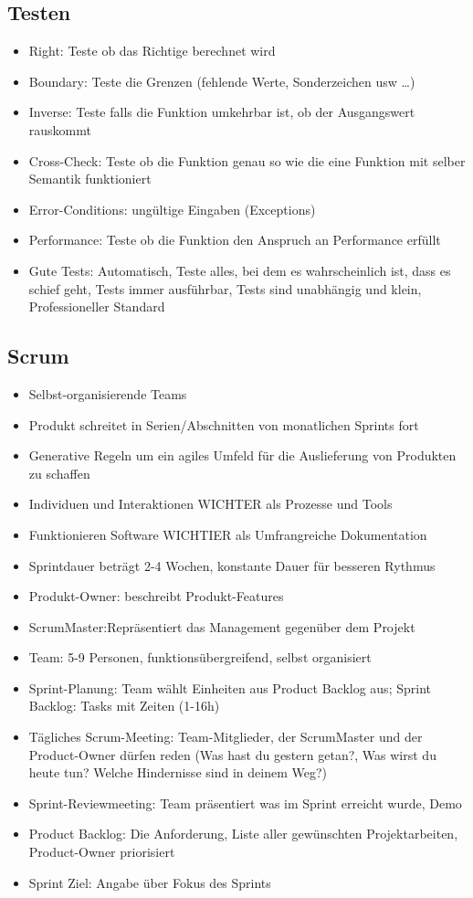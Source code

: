 \documentclass[11pt, fleqn, a4paper, leqno]{scrartcl} %
\begin{document}
		\subsection{Testen}
			\begin{itemize}
				\item Right: Teste ob das Richtige berechnet wird
				\item Boundary: Teste die Grenzen (fehlende Werte, Sonderzeichen usw \dots)
				\item Inverse: Teste falls die Funktion umkehrbar ist, ob der Ausgangswert rauskommt
				\item Cross-Check: Teste ob die Funktion genau so wie die eine Funktion mit selber Semantik funktioniert
				\item Error-Conditions: ungültige Eingaben (Exceptions)
				\item Performance: Teste ob die Funktion den Anspruch an Performance erfüllt
				\item Gute Tests: Automatisch, Teste alles, bei dem es wahrscheinlich ist, dass es schief geht, Tests immer ausführbar, Tests sind unabhängig und klein, Professioneller Standard
			\end{itemize}
		\subsection{Scrum}
			\begin{itemize}
				\item Selbst-organisierende Teams
				\item Produkt schreitet in Serien/Abschnitten von monatlichen Sprints fort
				\item Generative Regeln um ein agiles Umfeld für die Auslieferung von Produkten zu schaffen
				\item Individuen und Interaktionen WICHTER als Prozesse und Tools
				\item Funktionieren Software WICHTIER als Umfrangreiche Dokumentation
				\item Sprintdauer beträgt 2-4 Wochen, konstante Dauer für besseren Rythmus
				\item Produkt-Owner: beschreibt Produkt-Features
				\item ScrumMaster:Repräsentiert das Management gegenüber dem Projekt
				\item Team: 5-9 Personen, funktionsübergreifend, selbst organisiert
				\item Sprint-Planung: Team wählt Einheiten aus Product Backlog aus; Sprint Backlog: Tasks mit Zeiten (1-16h)
				\item Tägliches Scrum-Meeting: Team-Mitglieder, der ScrumMaster und der Product-Owner dürfen reden (Was hast du gestern getan?, Was wirst du heute tun? Welche Hindernisse sind in deinem Weg?)
				\item Sprint-Reviewmeeting: Team präsentiert was im Sprint erreicht wurde, Demo
				\item Product Backlog: Die Anforderung, Liste aller gewünschten Projektarbeiten, Product-Owner priorisiert
				\item Sprint Ziel: Angabe über Fokus des Sprints
			\end{itemize}
\end{document}
